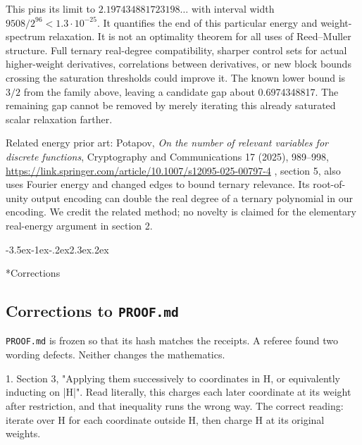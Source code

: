 \documentclass[11pt]{article}
\makeatletter
\renewcommand\section{\@startsection{section}{1}{\z@}
  {-3.5ex\@plus -1ex\@minus -.2ex}{2.3ex\@plus .2ex}
  {\normalfont\Large\bfseries\raggedright}}
\theoremstyle{remark}
\theoremstyle{correctionstyle}
\makeatother
\begin{document}
\leavevmode\label{src-p093}This pins its limit to $2.197434881723198\ldots$ with interval width
$9508/2^{96}<1.3\cdot10^{-25}$. It quantifies the end of this particular energy and
weight-spectrum relaxation. It is not an optimality theorem for all uses
of Reed–Muller structure. Full ternary real-degree compatibility, sharper
control sets for actual higher-weight derivatives, correlations between
derivatives, or new block bounds crossing the saturation thresholds could
improve it. The known lower bound is $3/2$ from the family above, leaving a
candidate gap about 0.6974348817. The remaining gap cannot be removed by
merely iterating this already saturated scalar relaxation farther.\label{src-end-p093}\par

\leavevmode\label{src-p094}Related energy prior art: Potapov, \emph{On the number of relevant variables for
discrete functions}, Cryptography and Communications 17 (2025), 989–998,
\url{https://link.springer.com/article/10.1007/s12095-025-00797-4} , section 5,
also uses Fourier energy and changed edges to bound ternary relevance.
Its root-of-unity output encoding can double the real degree of a ternary
polynomial in our encoding. We credit the related method; no novelty is
claimed for the elementary real-energy argument in section 2.\label{src-end-p094}\par

\clearpage\section*{Corrections}\label{corrections}
\subsection*{Corrections to {\normalfont\texttt{PROOF.md}}}
\texttt{PROOF.md} is frozen so that its hash matches the receipts. A referee found two wording defects. Neither changes the mathematics.\par

1. Section 3, "Applying them successively to coordinates in H, or equivalently inducting on |H|". Read literally, this charges each later coordinate at its weight after restriction, and that inequality runs the wrong way. The correct reading: iterate over H for each coordinate outside H, then charge H at its original weights.\par
\end{document}
